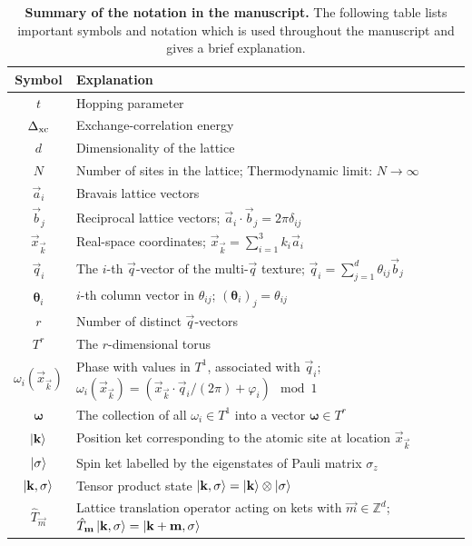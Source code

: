 \documentclass[
    10pt,
    aps,
    prb,
    twocolumn,
    floatfix,
    superscriptaddress,
]{revtex4-2}
\begin{document}
\begin{table}[t!]
	\centering
	\caption{{\bf Summary of the notation in the manuscript.} 
	The following table lists important symbols and notation which is used throughout the manuscript and gives a brief explanation.
	}
	\label{tab:notation}\vspace{0.2cm}
	\begin{tabular}{c|p{15cm}}
	 Symbol  & Explanation \\ \toprule
	$t$      & Hopping parameter \\
	$\Delta_\mathrm{xc}$    & Exchange-correlation energy \\
	$d$      & Dimensionality of the lattice \\
	$N$      & Number of sites in the lattice; Thermodynamic limit: $N\to\infty$ \\
	$\vec{a}_i$ & Bravais lattice vectors \\
	$\vec{b}_j$ & Reciprocal lattice vectors; $\vec{a}_i \cdot \vec{b}_j = 2\pi \delta_{ij}$ \\
	$\vec{x}_{\vec{k}}$ &  Real-space coordinates; $\vec{x}_{\vec{k}} = \sum_{i=1}^3 k_i \vec{a}_i $ \\
	$\vec{q}_i$ & The $i$-th $\vec{q}$-vector of the multi-$\vec{q}$ texture; 
	$\vec{q}_i = \sum_{j=1}^d \theta_{ij} \vec{b}_j$ \\
	$ \boldsymbol{\theta}_i$ & $i$-th column vector in $\theta_{ij}$;  $(\boldsymbol{\theta}_i)_j = \theta_{ij}$ \\
	$ r $  & Number of distinct $\vec{q}$-vectors \\
	$ T^r $ & The $r$-dimensional torus \\ 
	$ \omega_i (\vec{x}_\vec{k}) $ & Phase with values in $T^1$, associated with $\vec{q}_i$; $ \omega_i (\vec{x}_\vec{k}) =  (\vec{x}_\vec{k}  \cdot \vec{q}_i/ (2\pi) + \varphi_i) \mod 1 $ \\
	$\boldsymbol{\omega}$ & The collection of all $\omega_i \in T^1$ into a vector $\boldsymbol{\omega}\in T^r$ \\ 
	$\ket{\mathbf{k}} $ & Position ket corresponding to the atomic site at location $\vec{x}_\vec{k}$ \\
	$ \ket{\sigma} $ & Spin ket labelled by the eigenstates of Pauli matrix $\sigma_z$ \\
	$ \ket{\mathbf{k}, \sigma} $ & Tensor product state $ \ket{\mathbf{k}, \sigma} = \ket{\mathbf{k}} \otimes \ket{\sigma}$ \\
	$\hat{T}_{\vec{m}}$ & Lattice translation operator acting on kets with $\vec{m}\in \mathbb{Z}^d$; $  \hat{T}_{\mathbf{m}} \ket{\mathbf{k}, \sigma}  =  \ket{\mathbf{k}+ \mathbf{m}, \sigma}$ \\

\end{tabular}
\end{table}
\end{document}
